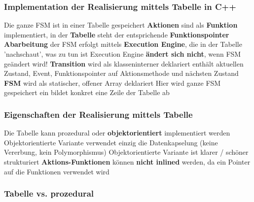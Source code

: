 \subsubsection{Implementation der Realisierung mittels Tabelle in C++}

\begin{outline}
    \1 Die ganze FSM ist in einer Tabelle gespeichert
    \1 \textbf{Aktionen} sind als \textbf{Funktion} implementiert, in der \textbf{Tabelle} steht der entsprichende \textbf{Funktionspointer} %
    \1 \textbf{Abarbeitung} der FSM erfolgt mittels \textbf{Execution Engine}, die in der Tabelle 'nachschaut', was zu tun ist
        \2 Execution Engine \textbf{ändert sich nicht}, wenn FSM geändert wird!
    \1 \textbf{Transition} wird als klasseninterner  deklariert
        \2 enthält aktuellen Zustand, Event, Funktionspointer auf Aktionsmethode und nächsten Zustand
    \1 \textbf{FSM} wird als statischer, offener Array deklariert
        \2 Hier wird ganze FSM gespeichert
        \2 ein  bildet konkret eine Zeile der Tabelle ab
\end{outline}


\subsubsection{Eigenschaften der Realisierung mittels Tabelle}

\begin{outline}
    \1 Die Tabelle kann prozedural oder \textbf{objektorientiert} implementiert werden
        \2 Objektorientierte Variante verwendet einzig die Datenkapselung (keine Vererbung, kein Polymorphismus)
        \2 Objektorientierte Variante ist klarer / schöner strukturiert
    \1 \textbf{Aktions-Funktionen} können \textbf{nicht inlined} werden, da ein Pointer auf die Funktionen verwendet wird
\end{outline}


\subsubsection{Tabelle vs. prozedural}

